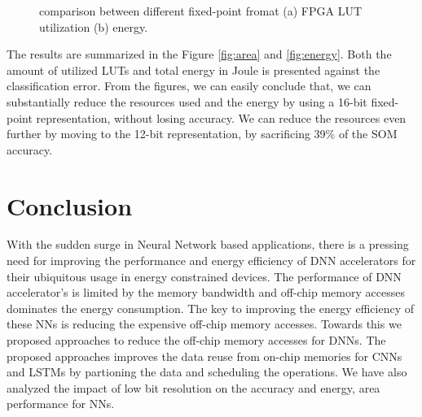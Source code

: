 \documentclass[a4paper,10pt]{article}
\begin{document}
\begin{figure}[!htb]
	\centering
	\hfil
	\caption{comparison between different fixed-point fromat (a) FPGA LUT utilization (b) energy.}
	\label{fig:metrics}
\end{figure}

The results are summarized in the Figure \ref{fig:area} and \ref{fig:energy}. Both the amount of utilized LUTs and total energy in Joule is presented against the classification error. From the figures, we can easily conclude that, we can substantially reduce the resources used and the energy by using a 16-bit fixed-point representation, without losing accuracy. We can reduce the resources even further by moving to the 12-bit representation, by sacrificing 39\% of the SOM accuracy. 

\section{Conclusion}
With the sudden surge in Neural Network based applications, there is a pressing need for improving the performance and energy efficiency of DNN accelerators for their ubiquitous usage in energy constrained devices. The performance of DNN accelerator's is limited by the memory bandwidth and off-chip memory accesses dominates the energy consumption. The key to improving the energy efficiency of these NNs is reducing the expensive off-chip memory accesses. Towards this we proposed approaches to reduce the off-chip memory accesses for DNNs. The proposed approaches improves the data reuse from on-chip memories for CNNs and LSTMs by partioning the data and scheduling the operations. We have also analyzed the impact of low bit resolution on the accuracy and energy, area performance for NNs. 

\footnotesize

\end{document}
